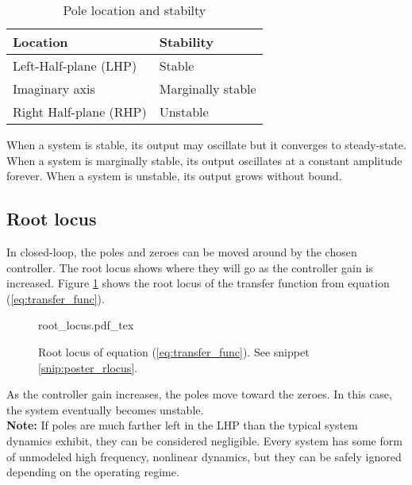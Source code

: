 \begin{table}
  \caption{Pole location and stabilty}
  \renewcommand{\arraystretch}{1.5}
  \centering
  \begin{tabular}{|ll|}
    \hline
    \rowcolor{lightblue}
    \textbf{Location} & \textbf{Stability} \\
    \hline
    Left-Half-plane (LHP) & Stable \\
    Imaginary axis & Marginally stable \\
    Right Half-plane (RHP) & Unstable \\
    \hline
  \end{tabular}
  \label{tab:pole_locations}
\end{table}

When a system is stable, its output may oscillate but it converges to
steady-state. When a system is marginally stable, its output oscillates at a
constant amplitude forever. When a system is unstable, its output grows without
bound.

\subsection{Root locus}

In closed-loop, the poles and zeroes can be moved around by the chosen
controller. The root locus shows where they will go as the controller gain is
increased. Figure \ref{fig:poster_rlocus} shows the root locus of the transfer
function from equation (\ref{eq:transfer_func}).

\begin{figure}[H]
  \def\svgwidth{\linewidth}
  {root_locus.pdf_tex}
  \caption{Root locus of equation (\ref{eq:transfer_func}). See snippet
    \ref{snip:poster_rlocus}.}
  \label{fig:poster_rlocus}
\end{figure}

\begin{snippet}
  \caption{Root locus in Python}
  \label{snip:poster_rlocus}
\end{snippet}

As the controller gain increases, the poles move toward the zeroes. In this
case, the \gls{system} eventually becomes unstable. \\

\textbf{Note:} If poles are much farther left in the LHP than the typical
\gls{system} dynamics exhibit, they can be considered negligible. Every
\gls{system} has some form of unmodeled high frequency, nonlinear dynamics, but
they can be safely ignored depending on the operating regime.

